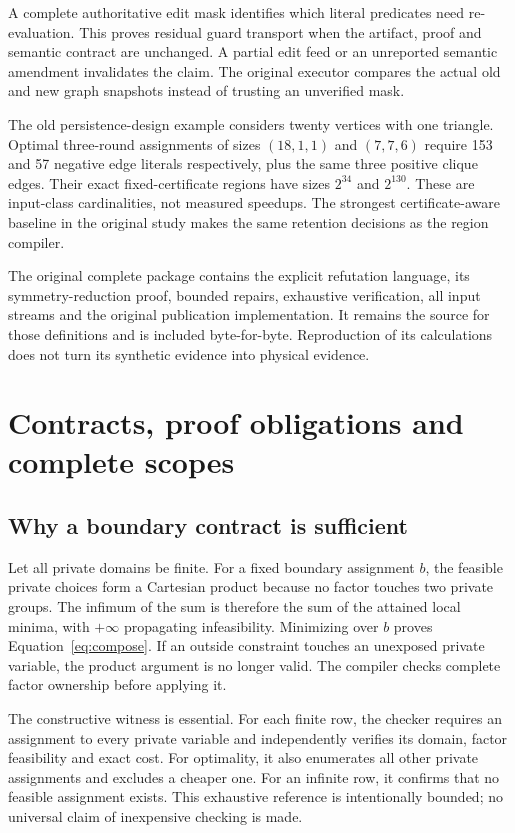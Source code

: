 \documentclass[11pt,letterpaper]{article}
\theoremstyle{definition}\newtheorem{definition}[theorem]{Definition}
\theoremstyle{remark}\newtheorem{remark}[theorem]{Remark}
\begin{document}
A complete authoritative edit mask identifies which literal predicates need re-evaluation. This proves residual guard transport when the artifact, proof and semantic contract are unchanged. A partial edit feed or an unreported semantic amendment invalidates the claim. The original executor compares the actual old and new graph snapshots instead of trusting an unverified mask.

The old persistence-design example considers twenty vertices with one triangle. Optimal three-round assignments of sizes $(18,1,1)$ and $(7,7,6)$ require 153 and 57 negative edge literals respectively, plus the same three positive clique edges. Their exact fixed-certificate regions have sizes $2^{34}$ and $2^{130}$. These are input-class cardinalities, not measured speedups. The strongest certificate-aware baseline in the original study makes the same retention decisions as the region compiler.

The original complete package contains the explicit refutation language, its symmetry-reduction proof, bounded repairs, exhaustive verification, all input streams and the original publication implementation. It remains the source for those definitions and is included byte-for-byte. Reproduction of its calculations does not turn its synthetic evidence into physical evidence.

\section{Contracts, proof obligations and complete scopes}
\label{app:proofs}
\subsection{Why a boundary contract is sufficient}
Let all private domains be finite. For a fixed boundary assignment $b$, the feasible private choices form a Cartesian product because no factor touches two private groups. The infimum of the sum is therefore the sum of the attained local minima, with $+\infty$ propagating infeasibility. Minimizing over $b$ proves Equation~\eqref{eq:compose}. If an outside constraint touches an unexposed private variable, the product argument is no longer valid. The compiler checks complete factor ownership before applying it.

The constructive witness is essential. For each finite row, the checker requires an assignment to every private variable and independently verifies its domain, factor feasibility and exact cost. For optimality, it also enumerates all other private assignments and excludes a cheaper one. For an infinite row, it confirms that no feasible assignment exists. This exhaustive reference is intentionally bounded; no universal claim of inexpensive checking is made.
\end{document}
